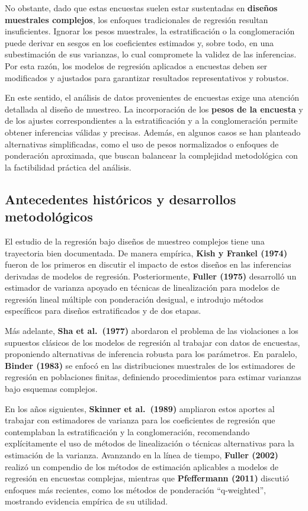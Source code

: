 \documentclass[
  spanish,
  12pt,
]{book}
\begin{document}
No obstante, dado que estas encuestas suelen estar sustentadas en \textbf{diseños muestrales complejos}, los enfoques tradicionales de regresión resultan insuficientes. Ignorar los pesos muestrales, la estratificación o la conglomeración puede derivar en sesgos en los coeficientes estimados y, sobre todo, en una subestimación de sus varianzas, lo cual compromete la validez de las inferencias. Por esta razón, los modelos de regresión aplicados a encuestas deben ser modificados y ajustados para garantizar resultados representativos y robustos.

En este sentido, el análisis de datos provenientes de encuestas exige una atención detallada al diseño de muestreo. La incorporación de los \textbf{pesos de la encuesta} y de los ajustes correspondientes a la estratificación y a la conglomeración permite obtener inferencias válidas y precisas. Además, en algunos casos se han planteado alternativas simplificadas, como el uso de pesos normalizados o enfoques de ponderación aproximada, que buscan balancear la complejidad metodológica con la factibilidad práctica del análisis.

\subsection{Antecedentes históricos y desarrollos metodológicos}\label{antecedentes-histuxf3ricos-y-desarrollos-metodoluxf3gicos}

El estudio de la regresión bajo diseños de muestreo complejos tiene una trayectoria bien documentada. De manera empírica, \textbf{Kish y Frankel (1974)} fueron de los primeros en discutir el impacto de estos diseños en las inferencias derivadas de modelos de regresión. Posteriormente, \textbf{Fuller (1975)} desarrolló un estimador de varianza apoyado en técnicas de linealización para modelos de regresión lineal múltiple con ponderación desigual, e introdujo métodos específicos para diseños estratificados y de dos etapas.

Más adelante, \textbf{Sha et al.~(1977)} abordaron el problema de las violaciones a los supuestos clásicos de los modelos de regresión al trabajar con datos de encuestas, proponiendo alternativas de inferencia robusta para los parámetros. En paralelo, \textbf{Binder (1983)} se enfocó en las distribuciones muestrales de los estimadores de regresión en poblaciones finitas, definiendo procedimientos para estimar varianzas bajo esquemas complejos.

En los años siguientes, \textbf{Skinner et al.~(1989)} ampliaron estos aportes al trabajar con estimadores de varianza para los coeficientes de regresión que contemplaban la estratificación y la conglomeración, recomendando explícitamente el uso de métodos de linealización o técnicas alternativas para la estimación de la varianza. Avanzando en la línea de tiempo, \textbf{Fuller (2002)} realizó un compendio de los métodos de estimación aplicables a modelos de regresión en encuestas complejas, mientras que \textbf{Pfeffermann (2011)} discutió enfoques más recientes, como los métodos de ponderación ``q-weighted'', mostrando evidencia empírica de su utilidad.
\end{document}
